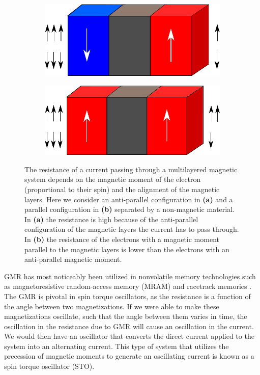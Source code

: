 \begin{figure}[h!]
\centering
  \begin{subfigure}[b]{.58\textwidth}
  \includegraphics[width=\linewidth]{Figures/GMR_AP.pdf}
  \caption{}
  \label{fig:GMR_AP}
\end{subfigure}
\begin{subfigure}[b]{.6\textwidth}
  \includegraphics[width=\linewidth]{Figures/GMR_P.pdf}
  \caption{}
  \label{fig:GMR_P}
\end{subfigure}
\caption{The resistance of a current passing through a multilayered magnetic system depends on the magnetic moment of the electron (proportional to their spin) and the alignment of the magnetic layers. Here we consider an anti-parallel configuration in \textbf{(a)} and a parallel configuration in \textbf{(b)} separated by a non-magnetic material. In \textbf{(a)} the resistance is high because of the anti-parallel configuration of the magnetic layers the current has to pass through. In \textbf{(b)} the resistance of the electrons with a magnetic moment parallel to the magnetic layers is lower than the electrons with an anti-parallel magnetic moment.}
\label{fig:GMR}
\end{figure}

GMR has most noticeably been utilized in nonvolatile memory technologies such as magnetoresistive random-access memory (MRAM) \cite{Akerman2005} and racetrack memories \cite{Parkin2008}. The GMR is pivotal in spin torque oscillators, as the resistance is a function of the angle between two magnetizations. If we were able to make these magnetizations oscillate, such that the angle between them varies in time, the oscillation in the resistance due to GMR will cause an oscillation in the current. We would then have an oscillator that converts the direct current applied to the system into an alternating current. This type of system that utilizes the precession of magnetic moments to generate an oscillating current is known as a spin torque oscillator (STO).

